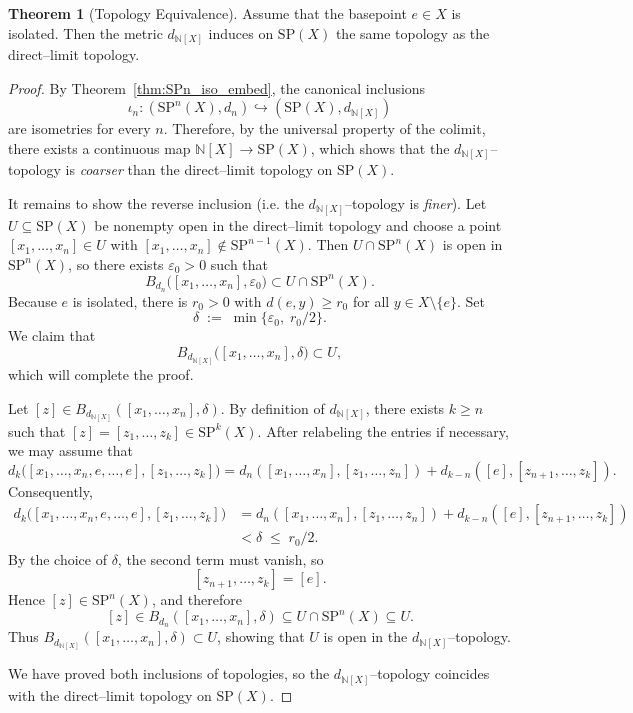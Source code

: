 \documentclass[10pt,a4paper]{article}
\theoremstyle{definition}
\newtheorem{theorem}{Theorem}[section]
\newcommand{\SP}{\mathrm{SP}}
\newcommand{\N}{\mathbb{N}}
\begin{document}
\begin{theorem}[Topology Equivalence]\label{thm:SP(X)_topology_equivalence}
Assume that the basepoint $e \in X$ is isolated. Then the metric $d_{\N[X]}$
induces on $\SP(X)$ the same topology as the direct--limit topology.
\end{theorem}
\begin{proof}
    By Theorem~\ref{thm:SPn_iso_embed}, the canonical inclusions
\[
\iota_n \colon (\SP^n(X),d_n)\hookrightarrow (\SP(X),d_{\N[X]})
\]
are isometries for every $n$. Therefore, by the universal property of the colimit, there exists a continuous
map $\N[X] \to \SP(X)$, which shows that the $d_{\N[X]}$–topology is
\emph{coarser} than the direct--limit topology on $\SP(X)$.


It remains to show the reverse inclusion (i.e. the $d_{\N[X]}$–topology is
\emph{finer}). Let $U\subseteq \SP(X)$ be nonempty open in the direct–limit topology
and choose a point $[x_1,\dots,x_n]\in U$ with
$[x_1,\dots,x_n]\notin \SP^{n-1}(X)$. Then $U\cap \SP^n(X)$ is open in
$\SP^n(X)$, so there exists $\varepsilon_0>0$ such that
\[
B_{d_n}\bigl([x_1,\dots,x_n],\varepsilon_0\bigr)\subset U\cap \SP^n(X).
\]
Because $e$ is isolated, there is $r_0>0$ with $d(e,y)\ge r_0$ for all
$y\in X\setminus\{e\}$. Set
\[
\delta \;:=\; \min\{\varepsilon_0,\; r_0/2\}.
\]
We claim that
\[
B_{d_{\N[X]}}\bigl([x_1,\dots,x_n],\delta\bigr)\subset U,
\]
which will complete the proof.

Let $[z]\in B_{d_{\N[X]}}([x_1,\dots,x_n],\delta)$. By definition of $d_{\N[X]}$,
there exists $k\ge n$ such that $[z]=[z_1,\dots,z_k]\in \SP^k(X)$. After
relabeling the entries if necessary, we may assume that
\[
d_k\!\bigl([x_1,\dots,x_n,e,\ldots,e],[z_1,\dots,z_k]\bigr)
= d_n([x_1,\dots,x_n],[z_1,\dots,z_n])
+ d_{k-n}([e],[z_{n+1},\dots,z_k]).
\]
Consequently,
\begin{align*}
d_k\!\bigl([x_1,\dots,x_n,e,\ldots,e],[z_1,\dots,z_k]\bigr)
&= d_n([x_1,\dots,x_n],[z_1,\dots,z_n])
+ d_{k-n}([e],[z_{n+1},\dots,z_k]) \\
&< \delta \;\le\; r_0/2.
\end{align*}
By the choice of $\delta$, the second term must vanish, so
\[
[z_{n+1},\dots,z_k]=[e].
\]
Hence $[z]\in \SP^n(X)$, and therefore
\[
[z]\in B_{d_n}([x_1,\dots,x_n],\delta)
\subseteq U\cap \SP^n(X)\subseteq U.
\]
Thus $B_{d_{\N[X]}}([x_1,\dots,x_n],\delta)\subset U$, showing that $U$ is open
in the $d_{\N[X]}$–topology.


We have proved both inclusions of topologies, so the $d_{\N[X]}$–topology
coincides with the direct–limit topology on $\SP(X)$.

\end{proof}
\end{document}
